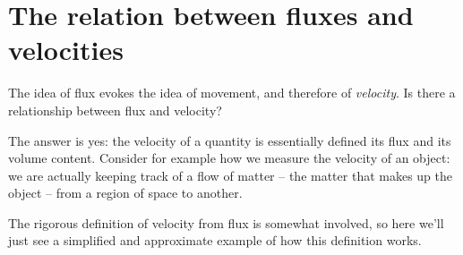 \documentclass[a4paper,12pt,%
onecolumn,oneside,%
british%
]{memoir}
\renewcommand*{\|}[1][]{\nonscript\:#1\vert\nonscript\:\mathopen{}}
\begin{document}
\section{The relation between fluxes and velocities}
\label{sec:fluxes_velocities}

The idea of flux evokes the idea of movement, and therefore of \emph{velocity}. Is there a relationship between flux and velocity?

The answer is yes: the velocity of a quantity is essentially defined its flux and its volume content. Consider for example how we measure the velocity of an object: we are actually keeping track of a flow of matter -- the matter that makes up the object -- from a region of space to another.

The rigorous definition of velocity from flux is somewhat involved, so here we'll just see a simplified and approximate example of how this definition works.
\end{document}
